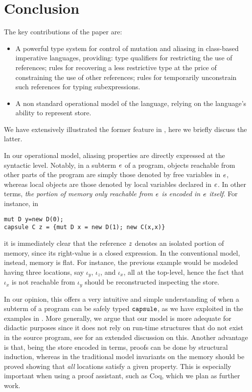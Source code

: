 \section{Conclusion}\label{sect:conclu}
The key contributions of the paper are:
\begin{itemize}
\item A powerful type system for control of mutation and aliasing in class-based imperative languages, providing: type qualifiers for restricting the use of references;  rules for {recovering} a less restrictive type at the price of {constraining} the use of other references; rules for temporarily {unconstrain such} references for typing subexpressions. 
\item A non standard operational model of the language, relying on the language's ability to represent {store}.
\end{itemize}

{We have extensively illustrated the former feature in , here we briefly discuss the latter.}

{In our operational model, aliasing properties are directly expressed at the syntactic level. Notably, in a subterm $\mathit{e}$ of a program, objects reachable from other parts of the program are simply those denoted by free variables in $\mathit{e}$, whereas local objects are those denoted by local variables declared in $\mathit{e}$. In other terms, \emph{the portion of memory only reachable from $\mathit{e}$ is encoded in $\mathit{e}$ itself}.  For instance, in}
\begin{lstlisting}
mut D y=new D(0); 
capsule C z = {mut D x = new D(1); new C(x,x)}
\end{lstlisting}
{it is immediately clear that the reference $\mathit{z}$ denotes an isolated portion of memory, since its right-value is a closed expression.
In the conventional model, instead, memory is flat. For instance, the previous example would be modeled having three locations, say $\iota_y$, $\iota_z$, and $\iota_x$, all at the top-level, hence the fact that $\iota_x$ is not reachable from $\iota_y$ should be reconstructed inspecting the store.}

{In our opinion, this offers a very intuitive and simple understanding of when a subterm of a program can be safely typed $\texttt{capsule}$, as we have exploited in the examples in . More generally, we argue that our model is more adequate for didactic purposes since it does not rely on run-time structures that do not exist in the source program, see \cite{ServettoLindsay13} for an extended discussion on this. Another advantage is that, being the store encoded in terms, proofs can be done by structural induction, whereas in the traditional model invariants on the memory should be proved showing that \emph{all} locations satisfy a given property. This is especially important when using a proof assistant, such as Coq, which we plan as further work. }

